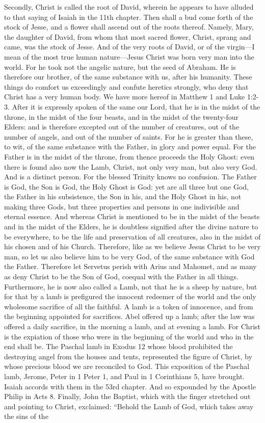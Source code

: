 Secondly, Christ is called the root of David, wherein he appears to have alluded to that saying of Isaiah in the 11th chapter. Then shall a bud come forth of the stock of Jesse, and a flower shall ascend out of the roots thereof. Namely, Mary, the daughter of David, from whom that most sacred flower, Christ, sprang and came, was the stock of Jesse. And of the very roots of David, or of the virgin—I mean of the most true human nature—Jesus Christ was born very man into the world. For he took not the angelic nature, but the seed of Abraham. He is therefore our brother, of the same substance with us, after his humanity. These things do comfort us exceedingly and confute heretics strongly, who deny that Christ has a very human body. We have more hereof in Matthew 1 and Luke 1:2-3. After it is expressly spoken of the same our Lord, that he is in the midst of the throne, in the midst of the four beasts, and in the midst of the twenty-four Elders: and is therefore excepted out of the number of creatures, out of the number of angels, and out of the number of saints. For he is greater than these, to wit, of the same substance with the Father, in glory and power equal. For the Father is in the midst of the throne, from thence proceeds the Holy Ghost: even there is found also now the Lamb, Christ, not only very man, but also very God. And is a distinct person. For the blessed Trinity knows no confusion. The Father is God, the Son is God, the Holy Ghost is God: yet are all three but one God, the Father in his subsistence, the Son in his, and the Holy Ghost in his, not making three Gods, but three properties and persons in one indivisible and eternal essence. And whereas Christ is mentioned to be in the midst of the beasts and in the midst of the Elders, he is doubtless signified after the divine nature to be everywhere, to be the life and preservation of all creatures, also in the midst of his chosen and of his Church. Therefore, like as we believe Jesus Christ to be very man, so let us also believe him to be very God, of the same substance with God the Father. Therefore let Servetus perish with Arius and Mahomet, and as many as deny Christ to be the Son of God, coequal with the Father in all things. Furthermore, he is now also called a Lamb, not that he is a sheep by nature, but for that by a lamb is prefigured the innocent redeemer of the world and the only wholesome sacrifice of all the faithful. A lamb is a token of innocence, and from the beginning appointed for sacrifices. Abel offered up a lamb; after the law was offered a daily sacrifice, in the morning a lamb, and at evening a lamb. For Christ is the expiation of those who were in the beginning of the world and who in the end shall be. The Paschal lamb in Exodus 12 whose blood prohibited the destroying angel from the houses and tents, represented the figure of Christ, by whose precious blood we are reconciled to God. This exposition of the Paschal lamb, Jerome, Peter in 1 Peter 1, and Paul in 1 Corinthians 5, have brought. Isaiah accords with them in the 53rd chapter. And so expounded by the Apostle Philip in Acts 8. Finally, John the Baptist, which with the finger stretched out and pointing to Christ, exclaimed: “Behold the Lamb of God, which takes away the sins of the 